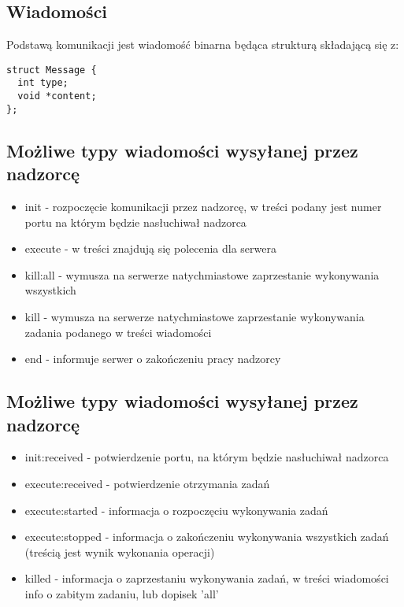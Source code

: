 \documentclass[11pt,a4paper]{article}
\begin{document}
\subsection{Wiadomości}
Podstawą komunikacji jest wiadomość binarna będąca strukturą składającą się z:\\
\begin{lstlisting}[caption = struktura wiadomości]
struct Message { 
  int type; 
  void *content; 
}; 
\end{lstlisting}

\newpage
\subsection{Możliwe typy wiadomości wysyłanej przez nadzorcę}
\begin{itemize}
  \item init - rozpoczęcie komunikacji przez nadzorcę, w treści podany jest numer portu na którym będzie nasłuchiwał nadzorca
  \item execute - w treści znajdują się polecenia dla serwera
  \item kill:all - wymusza na serwerze natychmiastowe zaprzestanie wykonywania wszystkich 
  \item kill - wymusza na serwerze natychmiastowe zaprzestanie wykonywania zadania podanego w treści wiadomości
  \item end - informuje serwer o zakończeniu pracy nadzorcy
\end{itemize}

\subsection{Możliwe typy wiadomości wysyłanej przez nadzorcę}
\begin{itemize}
  \item init:received - potwierdzenie portu, na którym będzie nasłuchiwał nadzorca
  \item execute:received - potwierdzenie otrzymania zadań
  \item execute:started - informacja o rozpoczęciu wykonywania zadań
  \item execute:stopped - informacja o zakończeniu wykonywania wszystkich zadań (treścią jest wynik wykonania operacji)
  \item killed - informacja o zaprzestaniu wykonywania zadań, w treści wiadomości info o zabitym zadaniu, lub dopisek 'all'
\end{itemize}
\end{document}
